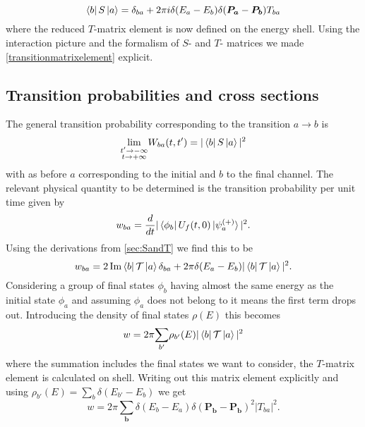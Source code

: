 \documentclass[11pt]{article}
\numberwithin{equation}{section}
\begin{document}
\begin{equation}
	\bra{b} S \ket{a} = \delta_{ba} + 2\pi i \delta(E_a-E_b)\delta(\boldsymbol{P_a}-\boldsymbol{P_b})T_{ba} 
\end{equation}
where the reduced $T$-matrix element is now defined on the energy shell. Using the interaction picture and the formalism of $S$- and $T$- matrices we made \eqref{transitionmatrixelement} explicit.






\subsection{Transition probabilities and cross sections}\label{sec:Probabilities and Cross sections}
The general transition probability corresponding to the transition $a \rightarrow b$ is
\begin{equation}
	\underset{\substack{t' \rightarrow - \infty \\ t \rightarrow + \infty}} \lim W_{ba}(t,t') = |\bra{b}S \ket{a}|^2
\end{equation}
with as before $a$ corresponding to the initial and $b$ to the final channel. The relevant physical quantity to be determined is the transition probability per unit time given by
\begin{equation}
w_{ba} = \frac{d}{dt}| \bra{\phi_b} U_f(t,0) \ket{\psi^{(+)}_a}|^2.	
\end{equation}
Using the derivations from \ref{sec:SandT} we find this to be
\begin{equation}
	w_{ba} = 2 \operatorname{Im}\bra{b} \mathcal{T} \ket{a} \delta_{ba} + 2\pi \delta(E_a-E_b)|\bra{b} \mathcal{T} \ket{a}|^2.
\end{equation}
Considering a group of final states $\phi_b$ having almost the same energy as the initial state $\phi_a$ and assuming $\phi_a$ does not belong to it means the first term drops out. Introducing the density of final states $\rho(E)$ this becomes
\begin{equation}
	w = 2\pi \underset{b'} \sum \rho_{b'}(E)|\bra{b} \mathcal{T} \ket{a}|^2
\end{equation}
where the summation includes the final states we want to consider, the $T$-matrix element is calculated on shell. Writing out this matrix element explicitly and using $\rho_{b'}(E) = \underset{b}\sum \delta(E_{b'} - E_b)$ we get
\begin{equation}
	w = 2 \pi \underset{\mathbf{b}} \sum \delta(E_b-E_a)\delta(\mathbf{P_b} - \mathbf{P_b})^2 |T_{ba}|^2.
\end{equation}
\end{document}
